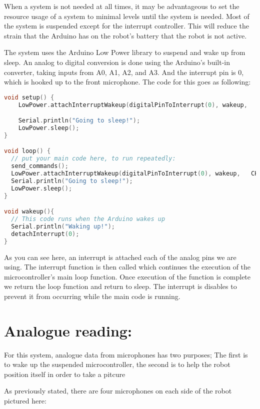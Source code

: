 \documentclass[12pt,a4paper]{article}
\begin{document}
When a system is not needed at all times, it may be advantageous to set the resource usage of a system to minimal levels until the system is needed. Most of the system is suspended except for the interrupt controller. This will reduce the strain that the Arduino has on the robot's battery that the robot is not active.

The system uses the Arduino Low Power library to suspend and wake up from sleep.
An analog to digital conversion is done using the Arduino's built-in converter, taking inputs from A0, A1, A2, and A3.
And the interrupt pin is 0, which is hooked up to the front microphone.
The code for this goes as following:

\begin{lstlisting}[language=C, caption=Low Power Code]
void setup() {
    LowPower.attachInterruptWakeup(digitalPinToInterrupt(0), wakeup,   CHANGE);

    Serial.println("Going to sleep!");
    LowPower.sleep();
}

void loop() {
  // put your main code here, to run repeatedly:
  send_commands();
  LowPower.attachInterruptWakeup(digitalPinToInterrupt(0), wakeup,   CHANGE);
  Serial.println("Going to sleep!");
  LowPower.sleep();
}

void wakeup(){
  // This code runs when the Arduino wakes up
  Serial.println("Waking up!");
  detachInterrupt(0);
}
\end{lstlisting}

As you can see here, an interrupt is attached each of the analog pins we are using.
The interrupt function is then called which continues the execution of the microcontroller's main loop function.
Once execution of the function is complete we return the loop function and return to sleep.
The interrupt is disables to prevent it from occurring while the main code is running.

\clearpage

\newpage

\section{Analogue reading: }

For this system, analogue data from microphones has two purposes; The first is to wake up the suspended microcontroller, the second is to help the robot position itself in order to take a pitcure

As previously stated, there are four microphones on each side of the robot pictured here:
\end{document}
